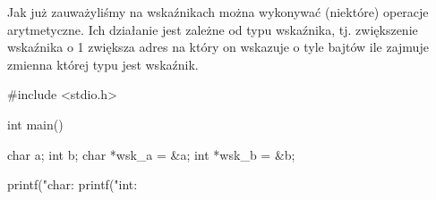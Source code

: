 \documentclass{pdfBooklets}
\begin{document}
Jak już zauważyliśmy na wskaźnikach można wykonywać (niektóre) operacje arytmetyczne. Ich działanie jest zależne od typu wskaźnika, tj. zwiększenie wskaźnika o 1 zwiększa adres na który on wskazuje o tyle bajtów ile zajmuje zmienna której typu jest wskaźnik.

\begin{CodeFrame*}[c]{}
#include <stdio.h>

int main() {
  char a;  int  b;
  char *wsk_a = &a;
  int  *wsk_b = &b;
  
  printf("char: %
  printf("int:  %
}
\end{CodeFrame*}

\end{document}
